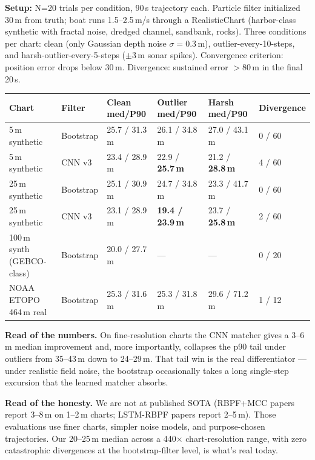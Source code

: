 \documentclass[10pt,a4paper]{article}
\begin{document}
\textbf{Setup:} N=20 trials per condition, 90\,s trajectory each. Particle
filter initialized 30\,m from truth; boat runs 1.5--2.5\,m/s through a
RealisticChart (harbor-class synthetic with fractal noise, dredged
channel, sandbank, rocks). Three conditions per chart: clean (only
Gaussian depth noise $\sigma{=}0.3$\,m), outlier-every-10-steps, and
harsh-outlier-every-5-steps ($\pm$3\,m sonar spikes). Convergence
criterion: position error drops below 30\,m. Divergence: sustained
error ${>}80$\,m in the final 20\,s.

\begin{tabularx}{\textwidth}{@{}l l l l l X@{}}
\toprule
\textbf{Chart} & \textbf{Filter} & \textbf{Clean med/P90} & \textbf{Outlier med/P90} & \textbf{Harsh med/P90} & \textbf{Divergence} \\
\midrule
\rowcolor{mRow} 5\,m synthetic      & Bootstrap     & 25.7 / 31.3\,m & 26.1 / 34.8\,m & 27.0 / 43.1\,m & 0 / 60 \\
5\,m synthetic                      & CNN v3        & 23.4 / 28.9\,m & 22.9 / \textbf{25.7\,m} & 21.2 / \textbf{28.8\,m} & 4 / 60 \\
\rowcolor{mRow} 25\,m synthetic     & Bootstrap     & 25.1 / 30.9\,m & 24.7 / 34.8\,m & 23.3 / 41.7\,m & 0 / 60 \\
25\,m synthetic                     & CNN v3        & 23.1 / 28.9\,m & \textbf{19.4 / 23.9\,m} & 23.7 / \textbf{25.8\,m} & 2 / 60 \\
\rowcolor{mRow} 100\,m synth (GEBCO-class) & Bootstrap & 20.0 / 27.7\,m & — & — & 0 / 20 \\
NOAA ETOPO 464\,m real              & Bootstrap     & 25.3 / 31.6\,m & 25.3 / 31.8\,m & 29.6 / 71.2\,m & 1 / 12 \\
\bottomrule
\end{tabularx}

\vspace{4pt}
\textbf{Read of the numbers.} On fine-resolution charts the CNN matcher
gives a 3--6\,m median improvement and, more importantly, collapses
the p90 tail under outliers from 35--43\,m down to 24--29\,m. That tail
win is the real differentiator — under realistic field noise, the
bootstrap occasionally takes a long single-step excursion that the
learned matcher absorbs.

\textbf{Read of the honesty.} We are not at published SOTA
(RBPF+MCC papers report 3--8\,m on 1--2\,m charts; LSTM-RBPF papers
report 2--5\,m). Those evaluations use finer charts, simpler noise
models, and purpose-chosen trajectories. Our 20--25\,m median across a
440$\times$ chart-resolution range, with zero catastrophic divergences
at the bootstrap-filter level, is what's real today.
\end{document}
